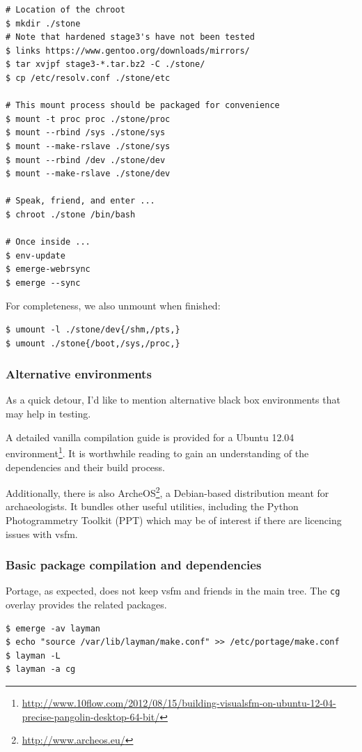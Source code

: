 \begin{lstlisting}
# Location of the chroot
$ mkdir ./stone
# Note that hardened stage3's have not been tested
$ links https://www.gentoo.org/downloads/mirrors/
$ tar xvjpf stage3-*.tar.bz2 -C ./stone/
$ cp /etc/resolv.conf ./stone/etc

# This mount process should be packaged for convenience
$ mount -t proc proc ./stone/proc
$ mount --rbind /sys ./stone/sys
$ mount --make-rslave ./stone/sys
$ mount --rbind /dev ./stone/dev
$ mount --make-rslave ./stone/dev

# Speak, friend, and enter ...
$ chroot ./stone /bin/bash

# Once inside ...
$ env-update
$ emerge-webrsync
$ emerge --sync
\end{lstlisting}

For completeness, we also unmount when finished:

\begin{lstlisting}
$ umount -l ./stone/dev{/shm,/pts,}
$ umount ./stone{/boot,/sys,/proc,}
\end{lstlisting}
\subsubsection{Alternative environments}
As a quick detour, I'd like to mention alternative black box environments that may help in testing.

A detailed vanilla compilation guide is provided for a Ubuntu 12.04 environment\footnote{\url{http://www.10flow.com/2012/08/15/building-visualsfm-on-ubuntu-12-04-precise-pangolin-desktop-64-bit/}}. It is worthwhile reading to gain an understanding of the dependencies and their build process.

Additionally, there is also ArcheOS\footnote{\url{http://www.archeos.eu/}}, a Debian-based distribution meant for archaeologists. It bundles other useful utilities, including the Python Photogrammetry Toolkit (PPT) which may be of interest if there are licencing issues with vsfm.
\subsubsection{Basic package compilation and dependencies}
Portage, as expected, does not keep vsfm and friends in the main tree. The {\tt cg} overlay provides the related packages.

\begin{lstlisting}
$ emerge -av layman
$ echo "source /var/lib/layman/make.conf" >> /etc/portage/make.conf
$ layman -L
$ layman -a cg
\end{lstlisting}

